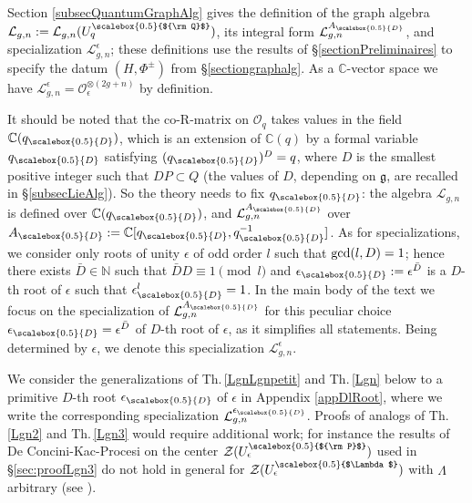 \documentclass[11pt]{amsart}
\newcommand{\e}{\epsilon}
\newcommand{\mc}{\mathbb{C}}
\newcommand{\Ll}{\mathcal{L}}
\newcommand{\Oo}{\mathcal{O}}
\newcommand{\qD}{q_{\scalebox{0.5}{D}}}
\newcommand{\eD}{\epsilon_{\scalebox{0.5}{D}}}
\newcommand{\AD}{A_{\scalebox{0.5}{D}}}
\newcommand{\Q}{{\scalebox{0.5}{${\rm Q}$}}}
\newcommand{\Pup}{{\scalebox{0.5}{${\rm P}$}}}
\newcommand{\Lam}{{\scalebox{0.5}{$\Lambda$}}}
\begin{document}
Section \ref{subsecQuantumGraphAlg} gives the definition of the graph algebra $\Ll_{g,n} := \Ll_{g,n}(U_q^\Q)$, its integral form $\Ll_{g,n}^{\AD}$, and specialization $\Ll_{g,n}^\e$; these definitions use the results of \S \ref{sectionPreliminaires} to specify the datum $(H,\Phi^\pm)$ from \S \ref{sectiongraphalg}. As a $\mathbb{C}$-vector space we have $\Ll_{g,n}^\e = \Oo_\e^{\otimes (2g+n)}$ by definition.

It should be noted that the co-R-matrix on $\Oo_q$ takes values in the field $\mc(\qD)$, which is an extension of $\mathbb{C}(q)$ by a formal variable $\qD$ satisfying $(\qD)^D=q$, where $D$ is the smallest positive integer such that $DP\subset Q$ (the values of $D$, depending on $\mathfrak{g}$, are recalled in \S \ref{subsecLieAlg}). So the theory needs to fix $\qD$: the algebra $\Ll_{g,n}$ is defined over $\mc(\qD)$, and $\Ll_{g,n}^{\AD}$ over $\AD := \mc[\qD,\qD^{-1}]$. As for specializations, we consider only roots of unity $\e$ of odd order $l$ such that ${\rm gcd}(l,D)=1$; hence there exists $\bar{D} \in \mathbb{N}$ such that $\bar{D}D\equiv 1 \pmod{l}$ and $\eD := \e^{\bar{D}}$ is a $D$-th root of $\e$ such that $\eD^l =1$. In the main body of the text we focus on the specialization of $\Ll_{g,n}^{\AD}$ for this peculiar choice $\eD = \e^{\bar{D}}$ of $D$-th root of $\e$, as it simplifies all statements. Being determined by $\e$, we denote this specialization $\Ll_{g,n}^\e$.

We consider the generalizations of Th.\,\ref{LgnLgnpetit} and Th.\,\ref{Lgn} below to a primitive $D$-th root $\eD$ of $\e$ in Appendix \ref{appDlRoot}, where we write the corresponding specialization $\Ll_{g,n}^{\eD}$. Proofs of analogs of  Th.\,\ref{Lgn2} and Th.\,\ref{Lgn3} would require additional work; for instance the results of De Concini-Kac-Procesi on the center $\mathcal{Z}(U_\e^\Pup)$ used in \S \ref{sec:proofLgn3} do not hold in general for $\mathcal{Z}(U_\e^\Lam)$ with $\Lambda$ arbitrary (see \cite[Rk.\,(a) on p.\,179]{DC-K-P1}).

\smallskip
\end{document}
